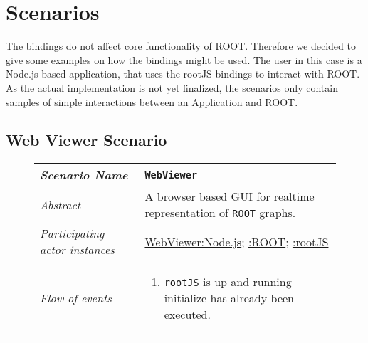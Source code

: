 \section{Scenarios}

The bindings do not affect core functionality of ROOT. Therefore 
we decided to give some examples on how the bindings might be used. The 
user in this case is a Node.js based application, that uses the rootJS bindings 
to interact with ROOT. As the actual implementation is not yet 
finalized, the scenarios only contain samples of simple interactions 
between an Application and ROOT.

\subsection{Web Viewer Scenario}
\begin{figure}[htb]
	\centering
	\begin{longtable}{p{3cm} @{\hskip 1cm} p{12cm}}
		\hline
		
		\textit{Scenario Name} &  \texttt{WebViewer}\\
		\hline
	
		\textit{Abstract} & A browser based GUI for realtime representation of \texttt{ROOT} graphs.\\
		\hline
	
		\textit{Participating actor instances} & \underline{WebViewer:Node.js}; \underline{:ROOT}; \underline{:rootJS}\\
		\hline
	
		\textit{Flow of events} & 
		\begin{enumerate}
			\item \texttt{rootJS} is up and running initialize has already been executed.
			

\end{enumerate}
\end{longtable}
\end{figure}
